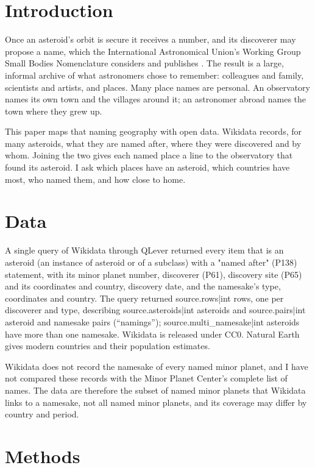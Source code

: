 \documentclass[11pt,a4paper]{article}
\begin{document}
\section{Introduction}
Once an asteroid's orbit is secure it receives a number, and its discoverer may propose a name, which the International Astronomical Union's Working Group Small Bodies Nomenclature considers and publishes \citep{mpc,wgsbn}. The result is a large, informal archive of what astronomers chose to remember: colleagues and family, scientists and artists, and places. Many place names are personal. An observatory names its own town and the villages around it; an astronomer abroad names the town where they grew up.

This paper maps that naming geography with open data. Wikidata \citep{wikidata} records, for many asteroids, what they are named after, where they were discovered and by whom. Joining the two gives each named place a line to the observatory that found its asteroid. I ask which places have an asteroid, which countries have most, who named them, and how close to home.

\section{Data}
A single query of Wikidata through QLever \citep{qlever} returned every item that is an asteroid (an instance of asteroid or of a subclass) with a "named after" (P138) statement, with its minor planet number, discoverer (P61), discovery site (P65) and its coordinates and country, discovery date, and the namesake's type, coordinates and country. The query returned {{source.rows|int}} rows, one per discoverer and type, describing {{source.asteroids|int}} asteroids and {{source.pairs|int}} asteroid and namesake pairs (``namings''); {{source.multi_namesake|int}} asteroids have more than one namesake. Wikidata is released under CC0. Natural Earth \citep{naturalearth} gives modern countries and their population estimates.

Wikidata does not record the namesake of every named minor planet, and I have not compared these records with the Minor Planet Center's complete list of names. The data are therefore the subset of named minor planets that Wikidata links to a namesake, not all named minor planets, and its coverage may differ by country and period.

\section{Methods}
\end{document}
